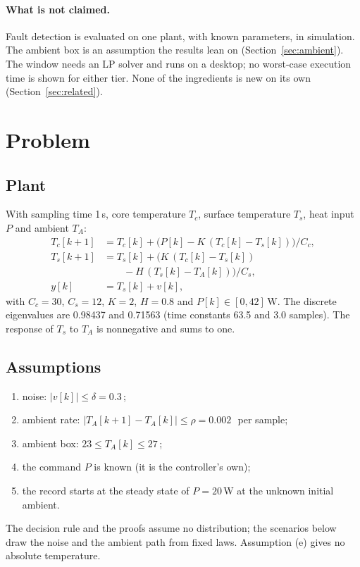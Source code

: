 \paragraph{What is not claimed.} Fault detection is evaluated on one plant, with known parameters, in simulation. The ambient box is an assumption the
results lean on (Section~\ref{sec:ambient}). The window needs an LP solver and runs on a desktop; no worst-case
execution time is shown for either tier. None of the ingredients is new on its own (Section~\ref{sec:related}).

\section{Problem}

\subsection{Plant}\label{sec:plant}

With sampling time 1\,s, core temperature $T_c$, surface temperature $T_s$, heat input $P$ and ambient $T_A$:
\begin{align*}
T_c[k+1] &= T_c[k] + \bigl(P[k] - K\,(T_c[k]-T_s[k])\bigr)/C_c,\\
T_s[k+1] &= T_s[k] + \bigl(K\,(T_c[k]-T_s[k])\\ &\qquad - H\,(T_s[k]-T_A[k])\bigr)/C_s,\\
y[k] &= T_s[k] + v[k],
\end{align*}
with $C_c = 30$, $C_s = 12$, $K = 2$, $H = 0.8$ and $P[k]\in[0,42]$\,W. The discrete eigenvalues are 0.98437 and
0.71563 (time constants 63.5 and 3.0 samples). The response of $T_s$ to $T_A$ is nonnegative and sums to one.

\subsection{Assumptions}

\begin{enumerate}[label=(\alph*)]
\item noise: $|v[k]|\le\delta = 0.3$\,\degC;
\item ambient rate: $|T_A[k+1]-T_A[k]|\le\rho = 0.002$\,\degC\ per sample;
\item ambient box: $23\le T_A[k]\le 27$\,\degC;
\item the command $P$ is known (it is the controller's own);
\item the record starts at the steady state of $P = 20$\,W at the unknown initial ambient.
\end{enumerate}
The decision rule and the proofs assume no distribution; the scenarios below draw the noise and the ambient path
from fixed laws. Assumption (e) gives no absolute temperature.

